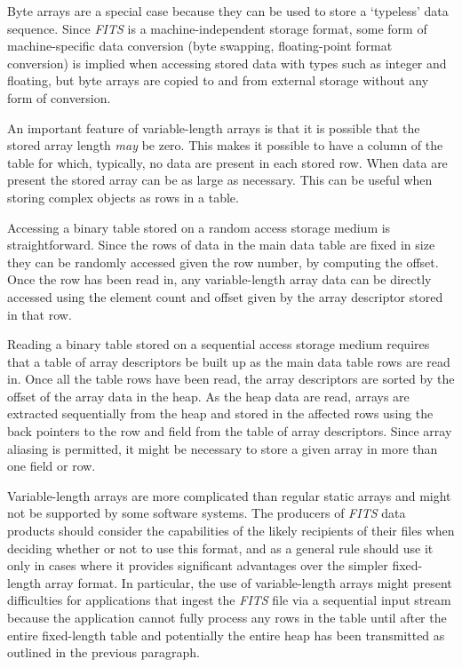 \documentclass[11pt,makeidx]{book}     %
\begin{document}
Byte arrays are a special case because they can be used to store a
`typeless' data sequence.  Since {\em FITS\/} is a machine-independent
storage format, some form of machine-specific data conversion (byte
swapping, floating-point format conversion) is implied when accessing
stored data with types such as integer and floating, but byte arrays
are copied to and from external storage without any form of
conversion.

An important feature of variable-length arrays is that it is possible
that the stored array length {\em may} be zero.  This makes it possible to
have a column of the table for which, typically, no data are present in
each stored row.  When data are present the stored array can be as
large as necessary.  This can be useful when storing complex objects
as rows in a table.

Accessing a binary table stored on a random access storage medium is
straightforward.  Since the rows of data in the main data table are fixed
in size they can be randomly accessed given the row number, by
computing the offset.  Once the row has been read in, any variable-length
array data can be directly accessed using the element count and
offset given by the array descriptor stored in that row.

Reading a binary table stored on a sequential access storage medium
requires that a table of array descriptors be built
up as the main data
table rows are read in.  Once all the table rows have been read,
the array descriptors are sorted by the offset of the array data in
the heap.  As the heap data are read, 
arrays are extracted sequentially
from the heap and stored in the affected rows using the back
pointers to the row and field from the table of array descriptors.
Since array aliasing is permitted, it might be necessary to store a
given array in more than one field or row.

Variable-length arrays are more complicated
than regular static arrays and
might not be supported by some software systems.  The producers of
{\em FITS\/} data products should consider the capabilities 
of the likely recipients of their files when deciding whether or
not to use this format, and as a general rule should use it only
in cases where it provides significant advantages over the simpler
fixed-length array format.  In particular, the use of variable-length
arrays might present difficulties for applications that ingest the
{\em FITS\/} file via a sequential input stream because the application 
cannot fully process any rows in the table until after the entire fixed-length
table and potentially the entire heap has been transmitted as outlined
in the previous paragraph.
\end{document}
